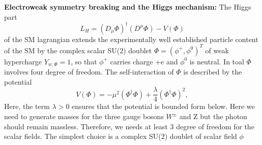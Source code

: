 {\bf Electroweak symmetry breaking and the Higgs mechanism:} \cite{article:LEPtoLHC, article:abd, article:tasi}
The Higgs part
	\begin{equation}
	L_H=(D_{\mu}\Phi)^{\dagger}(D^{\mu}\Phi)-V(\Phi)
	\end{equation}
of the SM lagrangian extends the experimentally well established particle content of the SM by the complex scalar SU(2) doublet $\Phi = (\phi^{+},\phi^0)^T$ of weak hypercharge $Y_{w,\Phi}=1$, so that $\phi^{+}$ carries charge +e and $\phi^0$ is neutral. In toal $\Phi$ involves four degree of freedom. The self-interaction of $\Phi$ is described by the potential
	\begin{equation}
	V(\Phi)=-\mu^2(\Phi^{\dagger}\Phi)+\frac{\lambda}{4}(\Phi^{\dagger}\Phi)^2,
	\end{equation}
Here, the term $\lambda > 0$ ensures that the potential is bounded form below. Here we need to generate masses for the three gauge bosons $W^{\pm}$ and Z but the photon should remain massless. Therefore, we needs at least 3 degree of freedom for the scalar fields. The simplest choice is a complex SU(2) doublet of scalar field $\phi$

